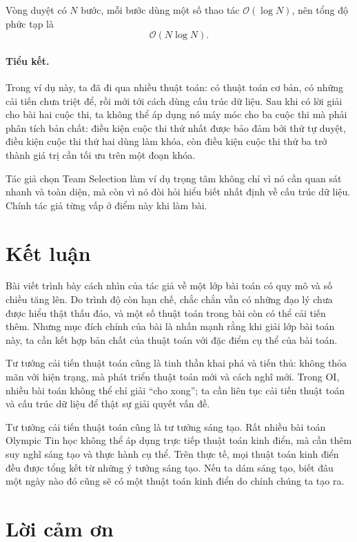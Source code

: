 \documentclass[11pt]{article}
\newcommand{\Oh}{\mathcal{O}}
\begin{document}
Vòng duyệt có $N$ bước, mỗi bước dùng một số thao tác $\Oh(\log N)$, nên tổng
độ phức tạp là
\[
  \Oh(N\log N).
\]

\paragraph{Tiểu kết.}
Trong ví dụ này, ta đã đi qua nhiều thuật toán: có thuật toán cơ bản, có những
cải tiến chưa triệt để, rồi mới tới cách dùng cấu trúc dữ liệu. Sau khi có
lời giải cho bài hai cuộc thi, ta không thể áp dụng nó máy móc cho ba cuộc thi
mà phải phân tích bản chất: điều kiện cuộc thi thứ nhất được bảo đảm bởi thứ
tự duyệt, điều kiện cuộc thi thứ hai dùng làm khóa, còn điều kiện cuộc thi thứ
ba trở thành giá trị cần tối ưu trên một đoạn khóa.

Tác giả chọn Team Selection làm ví dụ trọng tâm không chỉ vì nó cần quan sát
nhanh và toàn diện, mà còn vì nó đòi hỏi hiểu biết nhất định về cấu trúc dữ
liệu. Chính tác giả từng vấp ở điểm này khi làm bài.

\section{Kết luận}

Bài viết trình bày cách nhìn của tác giả về một lớp bài toán có quy mô và số
chiều tăng lên. Do trình độ còn hạn chế, chắc chắn vẫn có những đạo lý chưa
được hiểu thật thấu đáo, và một số thuật toán trong bài còn có thể cải tiến
thêm. Nhưng mục đích chính của bài là nhấn mạnh rằng khi giải lớp bài toán
này, ta cần kết hợp bản chất của thuật toán với đặc điểm cụ thể của bài toán.

Tư tưởng cải tiến thuật toán cũng là tinh thần khai phá và tiến thủ: không
thỏa mãn với hiện trạng, mà phát triển thuật toán mới và cách nghĩ mới. Trong
OI, nhiều bài toán không thể chỉ giải ``cho xong''; ta cần liên tục cải tiến
thuật toán và cấu trúc dữ liệu để thật sự giải quyết vấn đề.

Tư tưởng cải tiến thuật toán cũng là tư tưởng sáng tạo. Rất nhiều bài toán
Olympic Tin học không thể áp dụng trực tiếp thuật toán kinh điển, mà cần thêm
suy nghĩ sáng tạo và thực hành cụ thể. Trên thực tế, mọi thuật toán kinh điển
đều được tổng kết từ những ý tưởng sáng tạo. Nếu ta dám sáng tạo, biết đâu một
ngày nào đó cũng sẽ có một thuật toán kinh điển do chính chúng ta tạo ra.

\section*{Lời cảm ơn}
\end{document}
